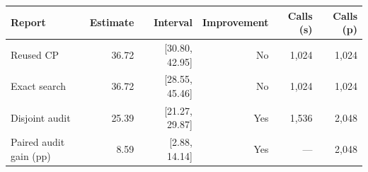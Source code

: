 \begin{tabular}{lrrrrr}
\toprule
Report & Estimate & Interval & Improvement & Calls (s) & Calls (p) \\
\midrule
Reused CP & 36.72 & [30.80, 42.95] & No & 1,024 & 1,024 \\
Exact search & 36.72 & [28.55, 45.46] & No & 1,024 & 1,024 \\
Disjoint audit & 25.39 & [21.27, 29.87] & Yes & 1,536 & 2,048 \\
Paired audit gain (pp) & 8.59 & [2.88, 14.14] & Yes & --- & 2,048 \\
\bottomrule
\end{tabular}
